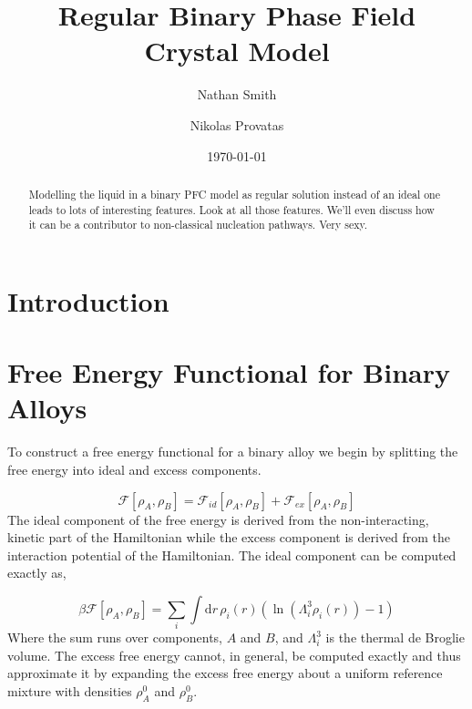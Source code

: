\documentclass[showkeys, prb, reprint]{revtex4-1}
\newcommand{\F}{\mathcal{F}}
\newcommand{\A}{\rho_A}
\newcommand{\B}{\rho_B}
\newcommand{\dd}{\mathrm{d}}
\renewcommand{\l}{\left}
\renewcommand{\r}{\right}
\begin{document}

\title{Regular Binary Phase Field Crystal Model}
\author{Nathan Smith}
\author{Nikolas Provatas}
\date{\today}

\begin{abstract}

Modelling the liquid in a binary PFC model as regular solution instead of an ideal one leads to lots of interesting features. Look at all those features. We'll even discuss how it can be a contributor to non-classical nucleation pathways. Very sexy.

\end{abstract}


\maketitle


\section{Introduction}

\section{Free Energy Functional for Binary Alloys}

To construct a free energy functional for a binary alloy we begin by splitting the free energy into ideal and excess components.

\begin{equation}
	\mathcal{F}[\A, \B] = \F_{id}[\A, \B] + \F_{ex}[\A, \B]
\end{equation}
The ideal component of the free energy is derived from the non-interacting, kinetic part of the Hamiltonian while the excess component is derived from the interaction potential of the Hamiltonian. The ideal component can be computed exactly as, 

\begin{equation}
	\beta\F[\A, \B] = \sum_{i} \int \dd r\, \rho_i(r) \l(\ln\l(\Lambda_i^3\rho_i(r)\r) -1 \r)
\end{equation}
Where the sum runs over components, $A$ and $B$, and $\Lambda_i^3$ is the thermal de Broglie volume. The excess free energy cannot, in general, be computed exactly and thus approximate it by expanding the excess free energy about a uniform reference mixture with densities $\A^0$ and $\B^0$.
\end{document}
